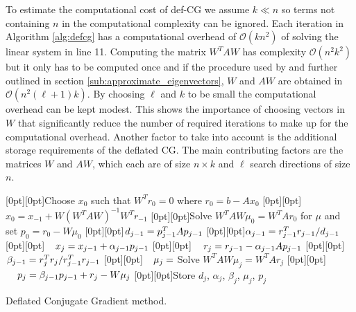 \documentclass{article}
\begin{document}
To estimate the computational cost of def-CG we assume $k\ll n$ so terms not containing $n$ in the computational complexity can be ignored. Each iteration in Algorithm \ref{alg:defcg} has a computational overhead of $\mathcal{O}(kn^2)$ of solving the linear system in line 11. Computing the matrix $W^TAW$ has complexity $\mathcal{O}(n^2k^2)$ but it only has to be computed once and if the procedure used by \citet{saad00} and further outlined in section \ref{sub:approximate_eigenvectors}, $W$ and $AW$ are obtained in $\mathcal{O}(n^2(\ell+1)k)$. By choosing $\ell$ and $k$ to be small the computational overhead can be kept modest. This shows the importance of choosing vectors in $W$ that significantly reduce the number of required iterations to make up for the computational overhead. Another factor to take into account is the additional storage requirements of the deflated CG. The main contributing factors are the matrices $W$ and $AW$, which each are of size $n\times k$ and $\ell$ search directions of size $n$. 

\begin{algorithm}
\begin{algorithmic}[1]
 
\LState \raisebox{0pt}[0pt][0pt]{Choose $x_0$ such that $W^Tr_0=0$ where $r_0=b-Ax_0$}
\LState \raisebox{0pt}[0pt][0pt]{$x_0=x_{-1}+W(W^TAW)^{-1}W^Tr_{-1}$}
\LState \raisebox{0pt}[0pt][0pt]{Solve $W^TAW\mu_0=W^TAr_0$ for $\mu$ and set $p_0=r_0-W\mu_0$} 
\LState \raisebox{0pt}[0pt][0pt]{$\phantom{\alpha_{j-1}}\mathllap{d_{j-1}}=p_{j-1}^TAp_{j-1}$} 
\LState \raisebox{0pt}[0pt][0pt]{$\phantom{\alpha_{j-1}}\mathllap{\alpha_{j-1}}=r_{j-1}^Tr_{j-1}/{d_{j-1}}$}
\LState \raisebox{0pt}[0pt][0pt]{$\phantom{\alpha_{j-1}}\mathllap{x_j}=x_{j-1}+\alpha_{j-1}p_{j-1}$}
\LState \raisebox{0pt}[0pt][0pt]{$\phantom{\alpha_{j-1}}\mathllap{r_j}=r_{j-1}-\alpha_{j-1}Ap_{j-1}$}
\LState \raisebox{0pt}[0pt][0pt]{$\phantom{\alpha_{j-1}}\mathllap{\beta_{j-1}}=r_{j}^Tr_{j}/r_{j-1}^Tr_{j-1}$} 
\LState \raisebox{0pt}[0pt][0pt]{$\phantom{\alpha_{j-1}}\mathllap{\mu_j} = $ Solve $W^TAW\mu_j=W^TAr_j$} 
\LState \raisebox{0pt}[0pt][0pt]{$\phantom{\alpha_{j-1}}\mathllap{p_j}=\beta_{j-1}p_{j-1}+r_j-W\mu_j$}
\LState \raisebox{0pt}[0pt][0pt]{Store $d_j$, $\alpha_j$, $\beta_j$, $\mu_j$, $p_j$}
\EndIf
\EndWhile
\EndProcedure
\end{algorithmic}
\caption{Deflated Conjugate Gradient method.}
\label{alg:defcg}
\end{algorithm}
\end{document}
